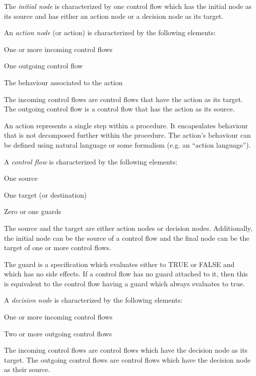 \documentclass[a4paper,10pt]{article}
\newenvironment{fw_itemize}						%
{\begin{itemize}
  \setlength{\itemsep}{1mm}
  \setlength{\parskip}{0pt}
  \setlength{\parsep}{0pt}}
{\end{itemize}}
\begin{document}
The \emph{initial node} is characterized by one control flow which has the initial node as its source
and has either an action node or a decision node as its target.

An \emph{action node} (or action) is characterized by the following elements:

\begin{fw_itemize} 
\item One or more incoming control flows
\item One outgoing control flow
\item The behaviour associated to the action
\end{fw_itemize}

The incoming control flows are control flows that have the action as its target. The outgoing
control flow is a control flow that has the action as its source.

An action represents a single step within a procedure. It encapsulates behaviour that is not
decomposed further within the procedure. The action's behaviour can be defined using natural
language or some formalism (e.g. an “action language”).

A \emph{control flow} is characterized by the following elements:

\begin{fw_itemize} 
\item One source
\item One target (or destination)
\item Zero or one guards
\end{fw_itemize}

The source and the target are either action nodes or decision nodes. Additionally, the initial
node can be the source of a control flow and the final node can be the target of one or
more control flows.

The guard is a specification which evaluates either to TRUE or FALSE and which
has no side effects. If a control flow has no guard attached to it, then this is equivalent to the control flow having a guard which always evaluates to true.

A \emph{decision node} is characterized by the following elements:
\begin{fw_itemize} 
\item One or more incoming control flows
\item Two or more outgoing control flows
\end{fw_itemize}

The incoming control flows are control flows which have the decision node as its target. The
outgoing control flows are control flows which have the decision node as their source.
\end{document}
